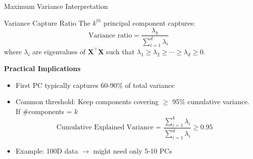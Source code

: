 \documentclass{beamer}
\begin{document}
\begin{frame}{Maximum Variance Interpretation}
    \begin{block}{Variance Capture Ratio}
        The $k^{th}$ principal component captures:
        \[
        \text{Variance ratio} = \frac{\lambda_k}{\sum_{i=1}^d \lambda_i}
        \]
        where $\lambda_i$ are eigenvalues of $\mathbf{X}^\top \mathbf{X}$ such that $
            \lambda_1 \geq \lambda_2 \geq \cdots \geq \lambda_d \geq0
            $.
    \end{block}

    \textbf{Practical Implications}
        \begin{itemize}
            \item First PC typically captures 60-90\% of total variance
            \item Common threshold: Keep components covering $\geq$ 95\% cumulative variance. If \#components = $k$
            \[
            \boxed{\text{Cumulative Explained Variance = }\frac{\sum_{i=1}^k \lambda_i}{\sum_{i=1}^d \lambda_i} \geq 0.95}
            \]
            \item Example: 100D data $\rightarrow$ might need only 5-10 PCs
        \end{itemize}

\end{frame}


\end{document}
